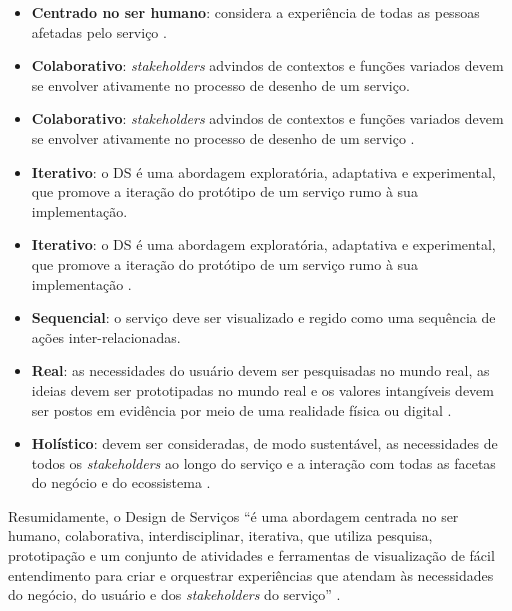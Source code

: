 \begin{itemize}

	\item \textbf{Centrado no ser humano}: considera a experiência de todas as pessoas afetadas pelo serviço \cite{Stickdorn2019, Norman2016Applying, mager2023product}.
	
	\item \textbf{Colaborativo}: \textit{stakeholders} advindos de contextos e funções variados devem se envolver ativamente no processo de desenho de um serviço.
	
	\item \textbf{Colaborativo}: \textit{stakeholders} advindos de contextos e funções variados devem se envolver ativamente no processo de desenho de um serviço \cite{Stickdorn2019, iriarte2023service, milton2021eatingdisorders}.
	
	\item \textbf{Iterativo}: o DS é uma abordagem exploratória, adaptativa e experimental, que promove a iteração do protótipo de um serviço rumo à sua implementação.
	
	\item \textbf{Iterativo}: o DS é uma abordagem exploratória, adaptativa e experimental, que promove a iteração do protótipo de um serviço rumo à sua implementação \cite{Stickdorn2019, kumar2023rheumatology, paust2025integrative}.
	
	\item \textbf{Sequencial}: o serviço deve ser visualizado e regido como uma sequência de ações inter-relacionadas.
	
	\item \textbf{Real}: as necessidades do usuário devem ser pesquisadas no mundo real, as ideias devem ser prototipadas no mundo real e os valores intangíveis devem ser postos em evidência por meio de uma realidade física ou digital \cite{Stickdorn2019, mager2023product, asbjornsen2022echange, lambe2022capabilities}.
	
	\item \textbf{Holístico}: devem ser consideradas, de modo sustentável, as necessidades de todos os \textit{stakeholders} ao longo do serviço e a interação com todas as facetas do negócio e do ecossistema \cite{Stickdorn2019, Tolle2024Vink, lee2022how}.
\end{itemize}

Resumidamente, o Design de Serviços ``é uma abordagem centrada no ser humano, colaborativa, interdisciplinar, iterativa, que utiliza pesquisa, prototipação e um conjunto de atividades e ferramentas de visualização de fácil entendimento para criar e orquestrar experiências que atendam às necessidades do negócio, do usuário e dos \textit{stakeholders} do serviço'' \cite{Stickdorn2019}.

